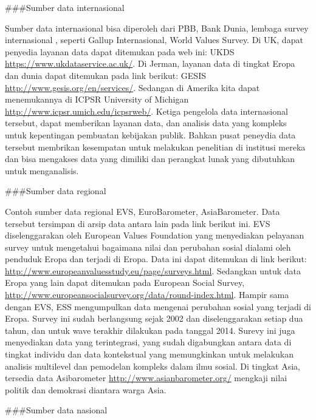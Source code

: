 \documentclass[
]{book}
\begin{document}
\#\#\#Sumber data internasional

Sumber data internasional bisa diperoleh dari PBB, Bank Dunia, lembaga survey internasional , seperti Gallup Internasional, World Values Survey. Di UK, dapat penyedia layanan data dapat ditemukan pada web ini: UKDS \url{https://www.ukdataservice.ac.uk/}. Di Jerman, layanan data di tingkat Eropa dan dunia dapat ditemukan pada link berikut: GESIS \url{http://www.gesis.org/en/services/}. Sedangan di Amerika kita dapat menemukannya di ICPSR University of Michigan \url{http://www.icpsr.umich.edu/icpsrweb/}. Ketiga pengelola data internasional tersebut, dapat memberikan layanan data, dan analisis data yang kompleks untuk kepentingan pembuatan kebijakan publik. Bahkan pusat peneydia data tersebut membrikan kesempatan untuk melakukan penelitian di institusi mereka dan bisa mengakses data yang dimiliki dan perangkat lunak yang dibutuhkan untuk menganalisis.

\#\#\#Sumber data regional

Contoh sumber data regional EVS, EuroBarometer, AsiaBarometer. Data tersebut tersimpan di arsip data antara lain pada link berikut ini. EVS diselenggarakan oleh European Values Foundation yang menyediakan pelayanan survey untuk mengetahui bagaimana nilai dan perubahan sosial dialami oleh penduduk Eropa dan terjadi di Eropa. Data ini dapat ditemukan di link berikut: \url{http://www.europeanvaluesstudy.eu/page/surveys.html}. Sedangkan untuk data Eropa yang lain dapat ditemukan pada European Social Survey, \url{http://www.europeansocialsurvey.org/data/round-index.html}. Hampir sama dengan EVS, ESS mengumpulkan data mengenai perubahan sosial yang terjadi di Eropa. Survey ini sudah berlangsung sejak 2002 dan diselenggarakan setiap dua tahun, dan untuk wave terakhir dilakukan pada tanggal 2014. Surevy ini juga menyediakan data yang terintegrasi, yang sudah digabungkan antara data di tingkat individu dan data kontekstual yang memungkinkan untuk melakukan analisis multilevel dan pemodelan kompleks dalam ilmu sosial. Di tingkat Asia, tersedia data Asibarometer \url{http://www.asianbarometer.org/} mengkaji nilai politik dan demokrasi diantara warga Asia.

\#\#\#Sumber data nasional
\end{document}
